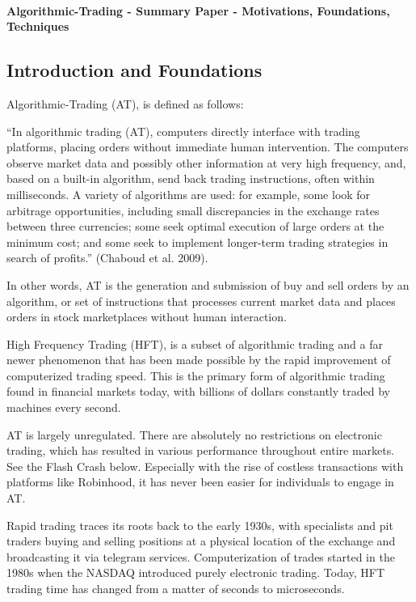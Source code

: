 \documentclass[letterpaper,11pt]{article}
\begin{document}
\thispagestyle{plain}


 \\

\noindent\textbf{Algorithmic-Trading - Summary Paper - Motivations, Foundations, Techniques}

\subsection*{Introduction and Foundations}

Algorithmic-Trading (AT), is defined as follows: \begin{displayquote} ``In algorithmic trading (AT), computers directly interface with trading platforms, placing orders without immediate human intervention. The computers observe market data and possibly other information at very high frequency, and, based on a
built-in algorithm, send back trading instructions, often within milliseconds. A
variety of algorithms are used: for example, some look for arbitrage opportunities,
including small discrepancies in the exchange rates between three currencies; some
seek optimal execution of large orders at the minimum cost; and some seek to
implement longer-term trading strategies in search of profits.'' (Chaboud et al.
2009). \end{displayquote} In other words, AT is the generation and submission of buy and sell orders by an algorithm, or set of instructions that processes current market data and places orders in stock marketplaces without human interaction. 

High Frequency Trading (HFT), is a subset of algorithmic trading and a far newer phenomenon that has been made possible by the rapid improvement of computerized trading speed. This is the primary form of algorithmic trading found in financial markets today, with billions of dollars constantly traded by machines every second. 

AT is largely unregulated. There are absolutely no restrictions on electronic trading, which has resulted in various performance throughout entire markets. See the Flash Crash below. Especially with the rise of costless transactions with platforms like Robinhood, it has never been easier for individuals to engage in AT. 

Rapid trading traces its roots back to the early 1930s, with specialists and pit traders buying and selling positions at a physical location of the exchange and broadcasting it via telegram services.  Computerization of trades started in the 1980s when the NASDAQ introduced purely electronic trading. Today, HFT trading time has changed from a matter of seconds to microseconds. 
\end{document}
